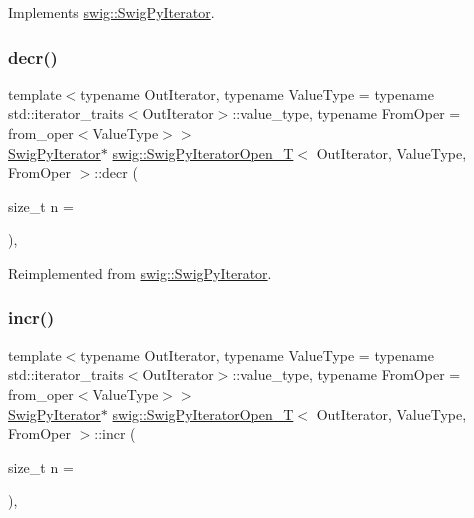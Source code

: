 Implements \hyperlink{structswig_1_1_swig_py_iterator_ae74c4b06f59975d9df19b30780cdefc1}{swig\+::\+Swig\+Py\+Iterator}.

\mbox{\label{classswig_1_1_swig_py_iterator_open___t_a5e556e6e84a3684129c79d38c171e976}} 
\subsubsection{\texorpdfstring{decr()}{decr()}}
{\footnotesize\ttfamily template$<$typename Out\+Iterator, typename Value\+Type = typename std\+::iterator\+\_\+traits$<$\+Out\+Iterator$>$\+::value\+\_\+type, typename From\+Oper = from\+\_\+oper$<$\+Value\+Type$>$$>$ \\
\hyperlink{structswig_1_1_swig_py_iterator}{Swig\+Py\+Iterator}$\ast$ \hyperlink{classswig_1_1_swig_py_iterator_open___t}{swig\+::\+Swig\+Py\+Iterator\+Open\+\_\+T}$<$ Out\+Iterator, Value\+Type, From\+Oper $>$\+::decr (\begin{DoxyParamCaption}\item[{size\+\_\+t}]{n = {} }\end{DoxyParamCaption})\hspace{0.3cm}{\ttfamily [inline]}, {\ttfamily [virtual]}}



Reimplemented from \hyperlink{structswig_1_1_swig_py_iterator_aad0c74a8c95526184fefb897476320ef}{swig\+::\+Swig\+Py\+Iterator}.

\mbox{\label{classswig_1_1_swig_py_iterator_open___t_a6d7ddd4cc294d13214372f7619cb7ce5}} 
\subsubsection{\texorpdfstring{incr()}{incr()}}
{\footnotesize\ttfamily template$<$typename Out\+Iterator, typename Value\+Type = typename std\+::iterator\+\_\+traits$<$\+Out\+Iterator$>$\+::value\+\_\+type, typename From\+Oper = from\+\_\+oper$<$\+Value\+Type$>$$>$ \\
\hyperlink{structswig_1_1_swig_py_iterator}{Swig\+Py\+Iterator}$\ast$ \hyperlink{classswig_1_1_swig_py_iterator_open___t}{swig\+::\+Swig\+Py\+Iterator\+Open\+\_\+T}$<$ Out\+Iterator, Value\+Type, From\+Oper $>$\+::incr (\begin{DoxyParamCaption}\item[{size\+\_\+t}]{n = {} }\end{DoxyParamCaption})\hspace{0.3cm}{\ttfamily [inline]}, {\ttfamily [virtual]}}



